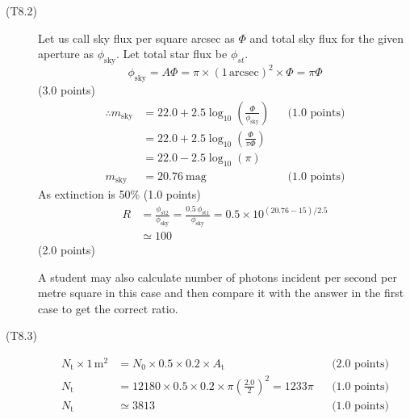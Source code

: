 \begin{description}
\item[(T8.2)]
Let us call sky flux per square arcsec as $\Phi$ and total sky flux for the
given aperture as $\phi_{\mathrm{sky}}$. Let total star flux be
$\phi_{st}$.
\[ \phi_{\mathrm{sky}} = A\Phi = \pi \times (1\,\mathrm{arcsec})^2 \times \Phi
   = \pi\Phi \]
\hfill(3.0 points)
\begin{align*}
\therefore m_{\mathrm{sky}}
  &= 22.0 + 2.5\log_{10}\left(\frac{\Phi}{\phi_{\mathrm{sky}}}\right)
  && \text{(1.0 points)} \\
  &= 22.0 + 2.5\log_{10}\left(\frac{\Phi}{\pi\Phi}\right) \\
  &= 22.0 - 2.5\log_{10}(\pi) \\
m_{\mathrm{sky}} &= 20.76~\mathrm{mag}
  && \text{(1.0 points)}
\end{align*}
As extinction is 50\% \hfill(1.0 points)
\begin{align*}
R &= \frac{\phi_{\mathrm{st2}}}{\phi_{\mathrm{sky}}}
   = \frac{0.5\,\phi_{\mathrm{st1}}}{\phi_{\mathrm{sky}}}
   = 0.5 \times 10^{(20.76 - 15)/2.5} \\
  &\simeq 100
\end{align*}
\hfill(2.0 points)

A student may also calculate number of photons incident per second per metre
square in this case and then compare it with the answer in the first case to
get the correct ratio.

\item[(T8.3)]
\begin{align*}
N_{\mathrm{t}} \times 1\,\mathrm{m}^2
  &= N_0 \times 0.5 \times 0.2 \times A_{\mathrm{t}}
  && \text{(2.0 points)} \\
N_{\mathrm{t}} &= 12180 \times 0.5 \times 0.2 \times
  \pi\left(\frac{2.0}{2}\right)^2 = 1233\pi
  && \text{(1.0 points)} \\
N_{\mathrm{t}} &\simeq 3813
  && \text{(1.0 points)}
\end{align*}
\end{description}


